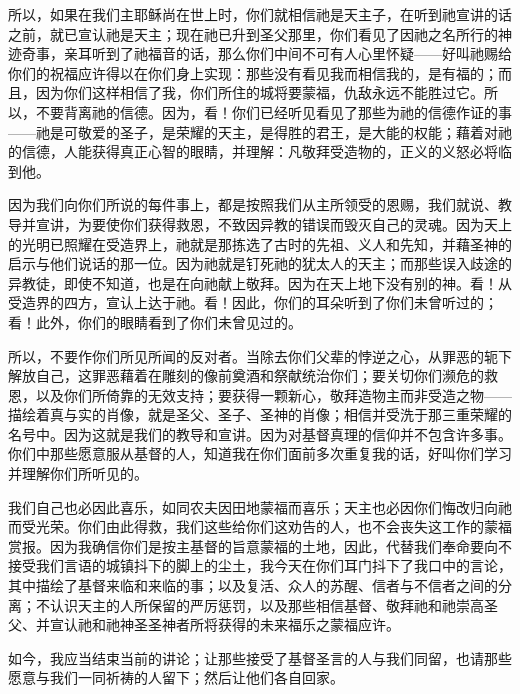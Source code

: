所以，如果在我们主耶稣尚在世上时，你们就相信祂是天主子，在听到祂宣讲的话之前，就已宣认祂是天主；现在祂已升到圣父那里，你们看见了因祂之名所行的神迹奇事，亲耳听到了祂福音的话，那么你们中间不可有人心里怀疑——好叫祂赐给你们的祝福应许得以在你们身上实现：那些没有看见我而相信我的，是有福的；而且，因为你们这样相信了我，你们所住的城将要蒙福，仇敌永远不能胜过它。所以，不要背离祂的信德。因为，看！你们已经听见看见了那些为祂的信德作证的事——祂是可敬爱的圣子，是荣耀的天主，是得胜的君王，是大能的权能；藉着对祂的信德，人能获得真正心智的眼睛，并理解：凡敬拜受造物的，正义的义怒必将临到他。\par

因为我们向你们所说的每件事上，都是按照我们从主所领受的恩赐，我们就说、教导并宣讲，为要使你们获得救恩，不致因异教的错误而毁灭自己的灵魂。因为天上的光明已照耀在受造界上，祂就是那拣选了古时的先祖、义人和先知，并藉圣神的启示与他们说话的那一位。因为祂就是钉死祂的犹太人的天主；而那些误入歧途的异教徒，即使不知道，也是在向祂献上敬拜。因为在天上地下没有别的神。看！从受造界的四方，宣认上达于祂。看！因此，你们的耳朵听到了你们未曾听过的；看！此外，你们的眼睛看到了你们未曾见过的。\par

所以，不要作你们所见所闻的反对者。当除去你们父辈的悖逆之心，从罪恶的轭下解放自己，这罪恶藉着在雕刻的像前奠酒和祭献统治你们；要关切你们濒危的救恩，以及你们所倚靠的无效支持；要获得一颗新心，敬拜造物主而非受造之物——描绘着真与实的肖像，就是圣父、圣子、圣神的肖像；相信并受洗于那三重荣耀的名号中。因为这就是我们的教导和宣讲。因为对基督真理的信仰并不包含许多事。你们中那些愿意服从基督的人，知道我在你们面前多次重复我的话，好叫你们学习并理解你们所听见的。\par

我们自己也必因此喜乐，如同农夫因田地蒙福而喜乐；天主也必因你们悔改归向祂而受光荣。你们由此得救，我们这些给你们这劝告的人，也不会丧失这工作的蒙福赏报。因为我确信你们是按主基督的旨意蒙福的土地，因此，代替我们奉命要向不接受我们言语的城镇抖下的脚上的尘土，我今天在你们耳门抖下了我口中的言论，其中描绘了基督来临和来临的事；以及复活、众人的苏醒、信者与不信者之间的分离；不认识天主的人所保留的严厉惩罚，以及那些相信基督、敬拜祂和祂崇高圣父、并宣认祂和祂神圣圣神者所将获得的未来福乐之蒙福应许。\par

如今，我应当结束当前的讲论；让那些接受了基督圣言的人与我们同留，也请那些愿意与我们一同祈祷的人留下；然后让他们各自回家。\par


